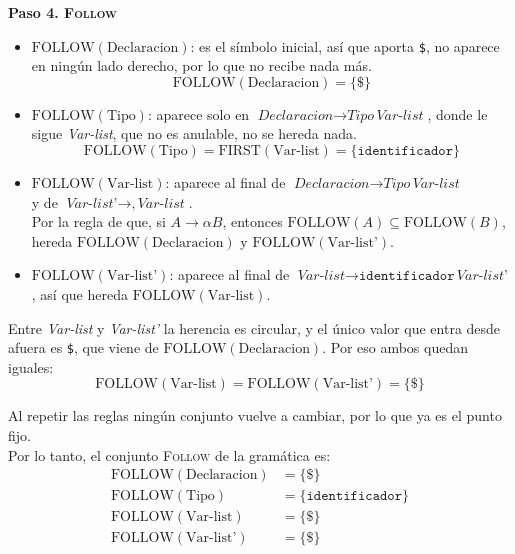 \documentclass[12pt,letterpaper]{article}
\newcommand{\nt}[1]{\textit{#1}}
\newcommand{\tk}[1]{\texttt{#1}}
\newcommand{\tx}[1]{\text{#1}}
\newcommand{\First}[1]{\mathrm{FIRST}(#1)}
\newcommand{\Follow}[1]{\mathrm{FOLLOW}(#1)}
\begin{document}
\begin{enumerate}[label=\arabic*.]
  \newpage
  
  \textbf{Paso 4. \textsc{Follow}}
  \begin{itemize}
  \item $\Follow{\tx{Declaracion}}$: es el símbolo inicial, así que aporta \tk{\$}, no aparece en ningún
    lado derecho, por lo que no recibe nada más.
    \[
    \Follow{\tx{Declaracion}} = \{\tk{\$}\}
    \]
    
  \item $\Follow{\tx{Tipo}}$: aparece solo en $\nt{Declaracion}\to\nt{Tipo}\,\nt{Var-list}$, donde le sigue
    \nt{Var-list}, que no es anulable, no se hereda nada.
    \[
    \Follow{\tx{Tipo}} = \First{\tx{Var-list}} = \{\tk{identificador}\}
    \]
    
  \item $\Follow{\tx{Var-list}}$: aparece al final de $\nt{Declaracion}\to\nt{Tipo}\,\nt{Var-list}$\\
    y de $\nt{Var-list'}\to\tk{,}\,\nt{Var-list}$.\\
    Por la regla de que, si $A\to\alpha B$, entonces $\Follow{A}\subseteq\Follow{B}$,\\
    hereda $\Follow{\tx{Declaracion}}$ y $\Follow{\tx{Var-list'}}$.

    \medskip
    
  \item $\Follow{\tx{Var-list'}}$: aparece al final de $\nt{Var-list}\to\tk{identificador}\,\nt{Var-list'}$,
    así que hereda $\Follow{\tx{Var-list}}$.
  \end{itemize}

  \medskip
  
  Entre \nt{Var-list} y \nt{Var-list'} la herencia es circular, y el único valor que entra desde afuera
  es \tk{\$}, que viene de $\Follow{\tx{Declaracion}}$. Por eso ambos quedan iguales:
  \[
  \Follow{\tx{Var-list}} = \Follow{\tx{Var-list'}} = \{\tk{\$}\}
  \]
  
  Al repetir las reglas ningún conjunto vuelve a cambiar, por lo que ya es el punto fijo.\\

  Por lo tanto, el conjunto \textsc{Follow} de la gramática es:
  \[
  \begin{aligned}
    \Follow{\tx{Declaracion}} &= \{\tk{\$}\} \\
    \Follow{\tx{Tipo}}        &= \{\tk{identificador}\} \\
    \Follow{\tx{Var-list}}    &= \{\tk{\$}\} \\
    \Follow{\tx{Var-list'}}   &= \{\tk{\$}\}
  \end{aligned}
  \]


\end{enumerate}
\end{document}
